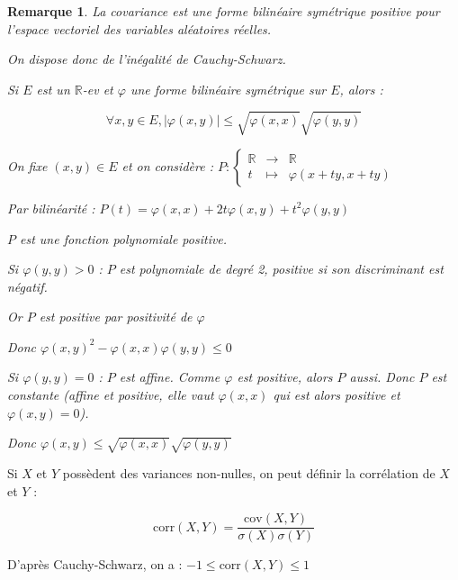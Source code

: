 \documentclass[a4paper,12pt]{book}
\newcommand{\Def}[2]{\begin{tcolorbox}[sharp corners, colback=white,colframe=blue!90!black!75, title=Définition : #1]#2\end{tcolorbox}}
\newtheorem{Rem}{Remarque}[section]
\def\R{\mathbb{R}}
\begin{document}
\begin{Rem}
La covariance est une forme bilinéaire symétrique positive pour l'espace vectoriel des variables aléatoires réelles.
\par On dispose donc de l'inégalité de Cauchy-Schwarz.
\par Si $E$ est un $\R$-ev et $\varphi$ une forme bilinéaire symétrique sur $E$, alors :
\par $$\forall x,y\in E, \vert \varphi(x,y)\vert\leq \sqrt{\varphi(x,x)}\sqrt{\varphi(y,y)}$$
\par On fixe $(x,y)\in E$ et on considère : $P:\left\{\begin{array}{rcl} \R & \to & \R \\ t & \mapsto & \varphi(x+ty, x+ty)\end{array}\right.$
\par Par bilinéarité : $P(t) = \varphi(x,x) + 2t\varphi(x,y)+t^2\varphi(y,y)$
\par $P$ est une fonction polynomiale positive.
\par Si $\varphi(y,y)> 0$ : $P$ est polynomiale de degré 2, positive si son discriminant est négatif.
\par Or $P$ est positive par positivité de $\varphi$
\par Donc $\varphi(x,y)^2 - \varphi(x,x)\varphi(y,y)\leq 0$
\par Si $\varphi(y,y)=0$ : $P$ est affine. Comme $\varphi$ est positive, alors $P$ aussi. Donc $P$ est constante (affine et positive, elle vaut $\varphi(x,x)$ qui est alors positive et $\varphi(x,y)=0$).
\par Donc $\varphi(x,y)\leq \sqrt{\varphi(x,x)}\sqrt{\varphi(y,y)}$
\end{Rem}
\Def{}{Si $X$ et $Y$ possèdent des variances non-nulles, on peut définir la corrélation de $X$ et $Y$ :
\par $$\mathrm{corr}(X,Y) = \frac{\mathrm{cov}(X,Y)}{\sigma(X)\sigma(Y)}$$
\par D'après Cauchy-Schwarz, on a : $-1\leq\mathrm{corr}(X,Y)\leq 1$}
\end{document}
